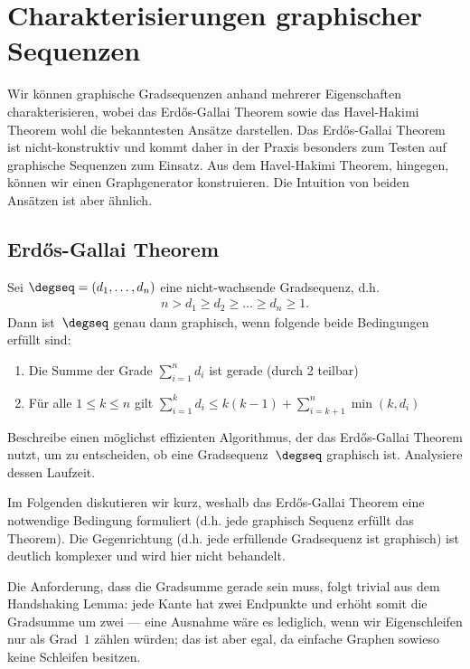 \section{Charakterisierungen graphischer Sequenzen}
Wir können graphische Gradsequenzen anhand mehrerer Eigenschaften charakterisieren, wobei das Erd\H{o}s-Gallai Theorem sowie das Havel-Hakimi Theorem wohl die bekanntesten Ansätze darstellen.
Das Erd\H{o}s-Gallai Theorem ist nicht-konstruktiv und kommt daher in der Praxis besonders zum Testen auf graphische Sequenzen zum Einsatz.
Aus dem Havel-Hakimi Theorem, hingegen, können wir einen Graphgenerator konstruieren.
Die Intuition von beiden Ansätzen ist aber ähnlich.

\subsection{Erd\H{o}s-Gallai Theorem}
\begin{theorem}
    Sei $\degseq = (d_1, \ldots, d_n)$ eine nicht-wachsende Gradsequenz, d.h.
    \begin{align}
        n > d_1 \ge d_2 \ge \ldots \ge d_n \ge 1.
    \end{align}
    Dann ist~$\degseq$ genau dann graphisch, wenn folgende beide Bedingungen erfüllt sind:
    \begin{enumerate}
        \item Die Summe der Grade $\sum_{i=1}^n d_i$ ist gerade (durch 2 teilbar)
        \item Für alle $1 \le k \le n$ gilt $\sum_{i=1}^k d_i \le k(k-1) + \sum_{i=k+1}^n \min(k, d_i)$\hfill\qedhere
    \end{enumerate}
\end{theorem}

\begin{exercise}
    Beschreibe einen möglichst effizienten Algorithmus, der das Erd\H{o}s-Gallai Theorem nutzt, um zu entscheiden, ob eine Gradsequenz~$\degseq$ graphisch ist.
    Analysiere dessen Laufzeit.
\end{exercise}

Im Folgenden diskutieren wir kurz, weshalb das Erd\H{o}s-Gallai Theorem eine notwendige Bedingung formuliert (d.h. jede graphisch Sequenz erfüllt das Theorem).
Die Gegenrichtung (d.h. jede erfüllende Gradsequenz ist graphisch) ist deutlich komplexer und wird hier nicht behandelt.

Die Anforderung, dass die Gradsumme gerade sein muss, folgt trivial aus dem Handshaking Lemma:
jede Kante hat zwei Endpunkte und erhöht somit die Gradsumme um zwei
--- eine Ausnahme wäre es lediglich, wenn wir Eigenschleifen nur als Grad~$1$ zählen würden; das ist aber egal, da einfache Graphen sowieso keine Schleifen besitzen.

